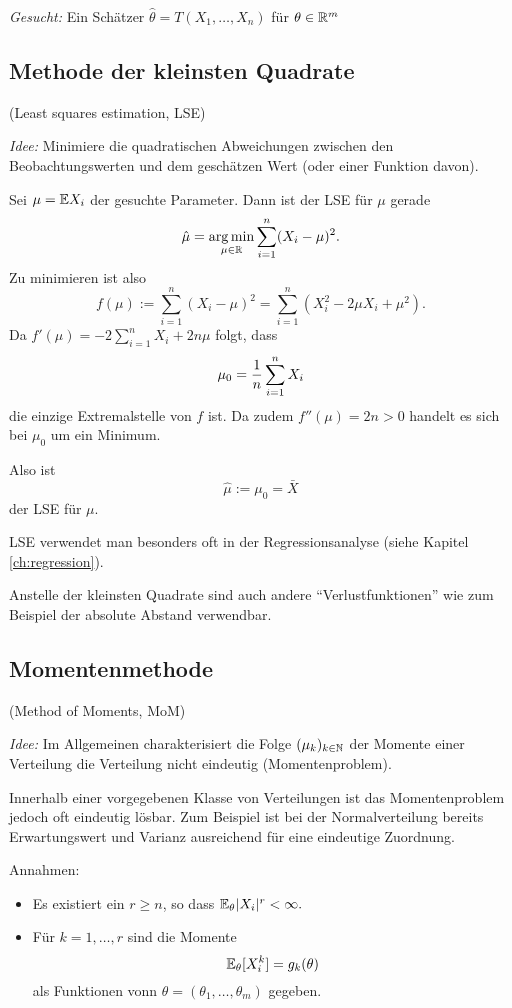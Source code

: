 \emph{Gesucht:} Ein Schätzer $\hat{\theta} = T(X_1, \ldots, X_n)$ für $\theta
\in \mathbb{R}^m$

\subsection{Methode der kleinsten Quadrate}
(Least squares estimation, LSE)

\emph{Idee:} Minimiere die quadratischen Abweichungen zwischen den
Beobachtungswerten und dem geschätzen Wert (oder einer Funktion davon).

\begin{exmp}
  Sei $\mu = \mathbb{E} X_i$ der gesuchte Parameter. Dann ist der LSE für $\mu$ gerade
  \[ \hat{\mu} = \operatorname*{arg\,min}_{\mu \in \mathbb{R}} \sum_{i=1}^n (X_i - \mu)^2. \]
  Zu minimieren ist also
  \[ f(\mu) := \sum_{i=1}^n (X_i - \mu)^2 = \sum_{i=1}^n (X_i^2 - 2 \mu X_i +
    \mu^2 ).\]
  Da $f'(\mu) = -2 \sum_{i=1}^n X_i + 2 n \mu$ folgt, dass
  \[ \mu_0 = \frac{1}{n} \sum_{i=1}^n X_i \]
  die einzige Extremalstelle von $f$ ist. Da zudem $f''(\mu) = 2n > 0$ handelt
  es sich bei $\mu_0$ um ein Minimum.

  Also ist
  \[ \hat{\mu} := \mu_0 = \bar{X} \]
  der LSE für $\mu$.
\end{exmp}
LSE verwendet man besonders oft in der Regressionsanalyse (siehe Kapitel
\ref{ch:regression}).

Anstelle der kleinsten Quadrate sind auch andere ``Verlustfunktionen'' wie zum
Beispiel der absolute Abstand verwendbar.

\subsection{Momentenmethode}
(Method of Moments, MoM)

\emph{Idee:} Im Allgemeinen charakterisiert die Folge $(\mu_k)_{k \in \mathbb{N}}$ der
Momente einer Verteilung die Verteilung nicht eindeutig (Momentenproblem).

Innerhalb einer vorgegebenen Klasse von Verteilungen ist das Momentenproblem
jedoch oft eindeutig lösbar. Zum Beispiel ist bei der Normalverteilung bereits
Erwartungswert und Varianz ausreichend für eine eindeutige Zuordnung.

Annahmen:
\begin{itemize}
\item Es existiert ein $r \ge n$, so dass $\mathbb{E}_\theta |X_i|^r < \infty.$
\item Für $k = 1, \ldots, r$ sind die Momente
  \[ \mathbb{E}_\theta [X_i^k] = g_k( \theta ) \]
  als Funktionen vonn $\theta = (\theta_1, \ldots, \theta_m)$ gegeben.
\end{itemize}

